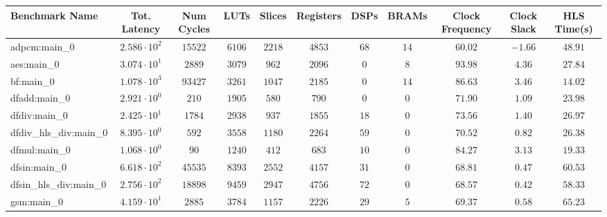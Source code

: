 \begin{tabular}{|l|c|c|c|c|c|c|c|c|c|c|}
\hline
Benchmark Name          & Tot. Latency           & Num Cycles & LUTs      & Slices    & Registers & DSPs    & BRAMs   & Clock Frequency & Clock Slack & HLS Time(s) \\
\hline
adpcm:main\_0           & $ 2.586 \cdot 10^{2} $ & $ 15522  $ & $ 6106  $ & $ 2218  $ & $ 4853  $ & $ 68  $ & $ 14  $ & $ 60.02       $ & $ -1.66   $ & $ 48.91   $ \\
aes:main\_0             & $ 3.074 \cdot 10^{1} $ & $ 2889   $ & $ 3079  $ & $ 962   $ & $ 2096  $ & $ 0   $ & $ 8   $ & $ 93.98       $ & $ 4.36    $ & $ 27.84   $ \\
bf:main\_0              & $ 1.078 \cdot 10^{3} $ & $ 93427  $ & $ 3261  $ & $ 1047  $ & $ 2185  $ & $ 0   $ & $ 14  $ & $ 86.63       $ & $ 3.46    $ & $ 14.02   $ \\
dfadd:main\_0           & $ 2.921 \cdot 10^{0} $ & $ 210    $ & $ 1905  $ & $ 580   $ & $ 790   $ & $ 0   $ & $ 0   $ & $ 71.90       $ & $ 1.09    $ & $ 23.98   $ \\
dfdiv:main\_0           & $ 2.425 \cdot 10^{1} $ & $ 1784   $ & $ 2938  $ & $ 937   $ & $ 1855  $ & $ 18  $ & $ 0   $ & $ 73.56       $ & $ 1.40    $ & $ 26.97   $ \\
dfdiv\_hls\_div:main\_0 & $ 8.395 \cdot 10^{0} $ & $ 592    $ & $ 3558  $ & $ 1180  $ & $ 2264  $ & $ 59  $ & $ 0   $ & $ 70.52       $ & $ 0.82    $ & $ 26.38   $ \\
dfmul:main\_0           & $ 1.068 \cdot 10^{0} $ & $ 90     $ & $ 1240  $ & $ 412   $ & $ 683   $ & $ 10  $ & $ 0   $ & $ 84.27       $ & $ 3.13    $ & $ 19.33   $ \\
dfsin:main\_0           & $ 6.618 \cdot 10^{2} $ & $ 45535  $ & $ 8393  $ & $ 2552  $ & $ 4157  $ & $ 31  $ & $ 0   $ & $ 68.81       $ & $ 0.47    $ & $ 60.53   $ \\
dfsin\_hls\_div:main\_0 & $ 2.756 \cdot 10^{2} $ & $ 18898  $ & $ 9459  $ & $ 2947  $ & $ 4756  $ & $ 72  $ & $ 0   $ & $ 68.57       $ & $ 0.42    $ & $ 58.33   $ \\
gsm:main\_0             & $ 4.159 \cdot 10^{1} $ & $ 2885   $ & $ 3784  $ & $ 1157  $ & $ 2226  $ & $ 29  $ & $ 5   $ & $ 69.37       $ & $ 0.58    $ & $ 65.23   $ \\

\end{tabular}

